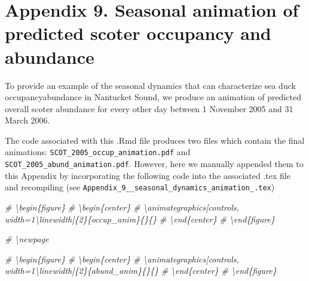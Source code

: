 \documentclass[12pt,]{article}
\title{}
\author{}
\date{}
\newenvironment{Shaded}{\begin{snugshade}}{\end{snugshade}}
\newcommand{\CommentTok}[1]{\textcolor[rgb]{0.56,0.35,0.01}{\textit{{#1}}}}
\begin{document}
\maketitle


\section{Appendix 9. Seasonal animation of predicted scoter occupancy
and
abundance}\label{appendix-9.-seasonal-animation-of-predicted-scoter-occupancy-and-abundance}

To provide an example of the seasonal dynamics that can characterize sea
duck occupancyabundance in Nantucket Sound, we produce an animation of
predicted overall scoter abundance for every other day between 1
November 2005 and 31 March 2006.

The code associated with this .Rmd file produces two files which contain
the final animations: \texttt{SCOT\_2005\_occup\_animation.pdf} and
\texttt{SCOT\_2005\_abund\_animation.pdf}. However, here we manually
appended them to this Appendix by incorporating the following code into
the associated .tex file and recompiling (see
\texttt{Appendix\_9\_\_seasonal\_dynamics\_animation\_.tex})

\begin{Shaded}
\begin{Highlighting}[]
\CommentTok{# \textbackslash{}begin\{figure\}}
\CommentTok{# \textbackslash{}begin\{center\}}
\CommentTok{# \textbackslash{}animategraphics[controls, width=1\textbackslash{}linewidth]\{2\}\{occup_anim\}\{\}\{\}}
\CommentTok{# \textbackslash{}end\{center\}}
\CommentTok{# \textbackslash{}end\{figure\}}

\CommentTok{# \textbackslash{}newpage}

\CommentTok{# \textbackslash{}begin\{figure\}}
\CommentTok{# \textbackslash{}begin\{center\}}
\CommentTok{# \textbackslash{}animategraphics[controls, width=1\textbackslash{}linewidth]\{2\}\{abund_anim\}\{\}\{\}}
\CommentTok{# \textbackslash{}end\{center\}}
\CommentTok{# \textbackslash{}end\{figure\}}
\end{Highlighting}
\end{Shaded}

\begin{figure}
\begin{center}
\end{center}
\end{figure}

\newpage

\begin{figure}
\begin{center}
\end{center}
\end{figure}
\end{document}
